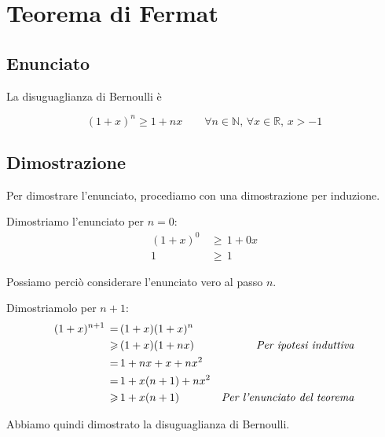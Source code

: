 \documentclass[../dimostrazioni]{subfiles}
\begin{document}
    \chapter{Teorema di Fermat}

        \section*{Enunciato}

            La disuguaglianza di Bernoulli è

            \[ (1 + x)^n \geqslant 1 + nx \qquad \forall n \in \mathbb{N}, \, \forall x \in \mathbb{R}, \, x > -1 \]

        \section*{Dimostrazione}

            Per dimostrare l'enunciato, procediamo con una dimostrazione per induzione.

            \medskip

            Dimostriamo l'enunciato per \(n = 0\):
            \begin{align*}
                (1 + x)^0 \, &\geqslant \, 1 + 0 x\\
                        1 \, &\geqslant \, 1
            \end{align*}

            Possiamo perciò considerare l'enunciato vero al passo \(n\).

            \medskip

            Dimostriamolo per \(n + 1\):
            \begin{align*}
                (1 + x)^{n + 1} \, =& \, (1 + x)(1 + x)^n\\
                                \geqslant& \, (1 + x)(1 + nx) & \text{\emph{Per ipotesi induttiva}}\\
                                =& \, 1 + nx + x + nx^2\\
                                =& \, 1 + x (n + 1) + nx^2\\
                                \geqslant& \, 1 + x (n + 1) & \text{\emph{Per l'enunciato del teorema}}
            \end{align*}

            Abbiamo quindi dimostrato la disuguaglianza di Bernoulli.
    
\end{document}
